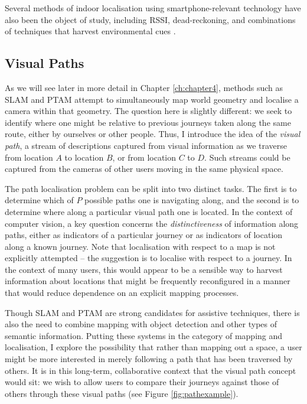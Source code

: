 Several methods of indoor localisation using smartphone\--re\-le\-vant technology have also been the object of study, including RSSI, dead-reckoning, and combinations of techniques that harvest environmental cues \cite{Wang2012,Shen}. 
 

\subsection{Visual Paths} 

 As we will see later in more detail in Chapter \ref{ch:chapter4}, methods such as SLAM and PTAM attempt to simultaneously map world geometry and localise a camera within that geometry.  The question here is slightly different: we seek to identify where one might be relative to previous journeys taken along the same route, either by ourselves or other people.  Thus, I introduce the idea of the \textit{visual path}, a stream of descriptions captured from visual information as we traverse from location $A$ to location $B$, or from location $C$ to $D$. Such streams could be captured from the cameras of other users moving in the same physical space.

The path localisation problem can be split into two distinct tasks.  The first is to determine which of $P$ possible paths one is navigating along, and the second is to determine where along a particular visual path one is located.  In the context of computer vision, a key question concerns the \textit{distinctiveness} of information along paths, either as indicators of a particular journey or as indicators of location along a known journey.  Note that localisation with respect to a map is not explicitly attempted -- the suggestion is to localise with respect to a journey.  In the context of many users, this would appear to be a sensible way to harvest information about locations that might be frequently reconfigured in a manner that would reduce dependence on an explicit mapping processes.

Though SLAM and PTAM are strong candidates for assistive techniques, there is also the need to combine mapping with object detection and other types of semantic information.  Putting these systems in the category of mapping and localisation, I explore the possibility that rather than mapping out a space, a user might be more interested in merely following a path that has been traversed by others.  It is in this long-term, collaborative context that the visual path concept would sit: we wish to allow users to compare their journeys against those of others through these visual paths (see Figure \ref{fig:pathexample}).

